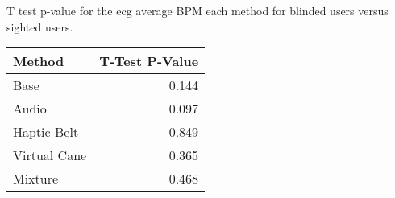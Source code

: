 
\centering
\caption{T test p-value for the ecg average BPM each method for blinded users versus sighted users.}
\label{tab:ttest_ecg_bpm}
\begin{tabular}{lr}
\toprule
      Method &  T-Test P-Value \\
\midrule
        Base &           0.144 \\
       Audio &           0.097 \\
 Haptic Belt &           0.849 \\
Virtual Cane &           0.365 \\
     Mixture &           0.468 \\
\bottomrule
\end{tabular}
